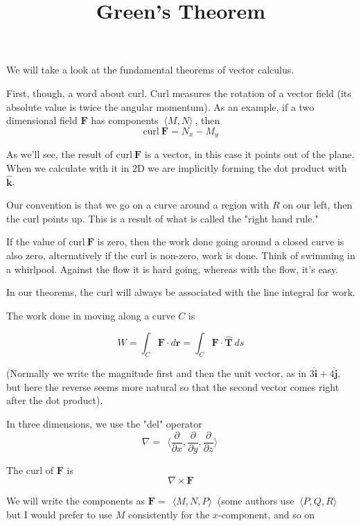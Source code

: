 \documentclass[11pt, oneside]{article}
\title{Green's Theorem}
\date{}
\begin{document}
\maketitle
\Large

\label{sec:green}

We will take a look at the fundamental theorems of vector calculus.

First, though, a word about curl.  Curl measures the rotation of a vector field (its absolute value is twice the angular momentum).  As an example, if a two dimensional field $\mathbf{F}$ has components $\ \langle M,N \rangle \ $, then
\[ \text{curl} \ \mathbf{F} = N_x - M_y \]

As we'll see, the result of $\text{curl} \ \mathbf{F}$ is a vector, in this case it points out of the plane.  When we calculate with it in 2D we are implicitly forming the dot product with $\hat{\mathbf{k}}$.

Our convention is that we go on a curve around a region with $R$ on our left, then the curl points up.  This is a result of what is called the "right hand rule."

If the value of $\text{curl} \ \mathbf{F}$ is zero, then the work done going around a closed curve is also zero, alternatively if the curl is non-zero, work is done.  Think of swimming in a whirlpool.  Against the flow it is hard going, whereas with the flow, it's easy.

In our theorems, the curl will always be associated with the line integral for work.

The work done in moving along a curve $C$ is

\[ W = \int_C \mathbf{F} \cdot d\mathbf{r}  = \int_C \mathbf{F} \cdot \hat{\mathbf{T}} \ ds \]

(Normally we write the magnitude first and then the unit vector, as in $3 \mathbf{\hat{i}} + 4 \mathbf{\hat{j}}$, but here the reverse seems more natural so that the second vector comes right after the dot product).

In three dimensions, we use the "del" operator
\[ \nabla = \ \ \langle \frac{\partial}{\partial x},\frac{\partial}{\partial y},\frac{\partial}{\partial z}  \rangle \  \]

The curl of $\mathbf{F}$ is
\[ \nabla \times \mathbf{F} \]

We will write the components as $\mathbf{F} = \ \ \langle M,N,P \rangle \ $ (some authors use $\ \langle P,Q,R \rangle \ $ but I would prefer to use $M$ consistently for the $x$-component, and so on
\end{document}
